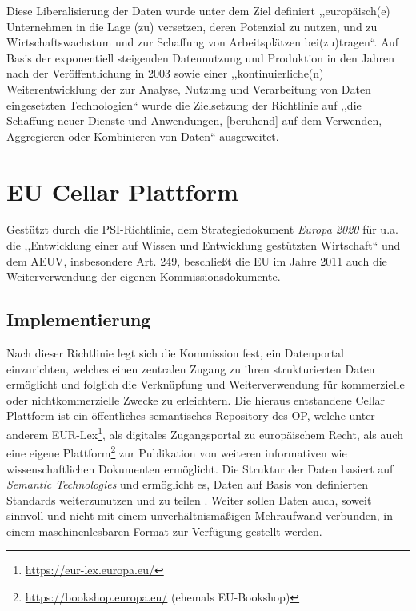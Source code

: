     \medskip
    Diese Liberalisierung der Daten wurde unter dem Ziel definiert ,,europäisch(e) Unternehmen in die Lage (zu) versetzen, deren Potenzial zu nutzen, und zu Wirtschaftswachstum und zur Schaffung von Arbeitsplätzen bei(zu)tragen``\cite[ErwG. 5]{2003L0098}. 
    Auf Basis der exponentiell steigenden Datennutzung und Produktion in den Jahren nach der Veröffentlichung in 2003 sowie einer ,,kontinuierliche(n) Weiterentwicklung der zur Analyse, Nutzung und Verarbeitung von Daten eingesetzten Technologien``\cite[ErwG. 5]{2013L0037} wurde die Zielsetzung der Richtlinie auf ,,die Schaffung neuer Dienste und Anwendungen, [beruhend] auf dem Verwenden, Aggregieren oder Kombinieren von Daten``\cite[ErwG. 5]{2013L0037} ausgeweitet. 
    
\pagebreak
\section{EU Cellar Plattform}

    Gestützt durch die PSI-Richtlinie, dem Strategiedokument \textit{Europa 2020} für u.a. die ,,Entwicklung einer auf Wissen und Entwicklung gestützten Wirtschaft`` und dem \acf{AEUV}, insbesondere Art. 249, beschließt die \ac{EU} im Jahre 2011 auch die Weiterverwendung der eigenen Kommissionsdokumente. \cite[ErwG. 1]{2011D0833}
    
\subsection{Implementierung}
\vspace{-1mm}

    Nach dieser Richtlinie legt sich die Kommission fest, ein Datenportal einzurichten, welches einen zentralen Zugang zu ihren strukturierten Daten ermöglicht und folglich die Verknüpfung und Weiterverwendung für kommerzielle oder nichtkommerzielle Zwecke zu erleichtern. \cite[Art. 5]{2011D0833}
    Die hieraus entstandene Cellar Plattform ist ein öffentliches semantisches Repository des \ac{OP}, welche unter anderem EUR-Lex\footnote{\href{https://eur-lex.europa.eu/homepage.html?locale=de}{https://eur-lex.europa.eu/}}, als digitales Zugangsportal zu europäischem Recht, als auch eine eigene Plattform\footnote{\href{https://bookshop.europa.eu/}{https://bookshop.europa.eu/} (ehemals EU-Bookshop)} zur Publikation von weiteren informativen wie wissenschaftlichen Dokumenten ermöglicht.
    Die Struktur der Daten basiert auf \textit{Semantic Technologies} und ermöglicht es, Daten auf Basis von definierten Standards weiterzunutzen und zu teilen \cite[5]{eu_cellar}.
    Weiter sollen Daten auch, soweit sinnvoll und nicht mit einem unverhältnismäßigen Mehraufwand verbunden, in einem maschinenlesbaren Format zur Verfügung gestellt werden. \cite[Art. 8 Abs. 1f]{2011D0833}

